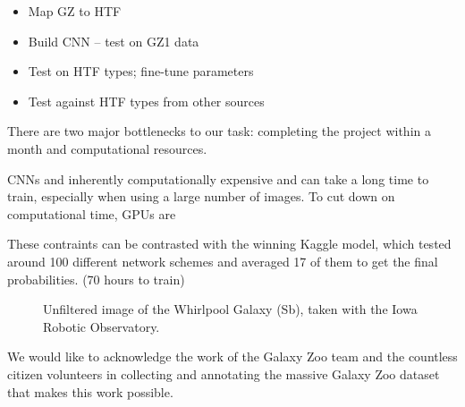 \documentclass[twocolumn]{aastex6}
\begin{document}
\begin{itemize}
\item	Map GZ to HTF
\item	Build CNN -- test on GZ1 data
\item	Test on HTF types; fine-tune parameters
\item	Test against HTF types from other sources
\end{itemize}

There are two major bottlenecks to our task: completing the project within a month and computational resources. 

CNNs and inherently computationally expensive and can take a long time to train, especially when using a large number of images. To cut down on computational time, GPUs are 

These contraints can be contrasted with the winning Kaggle model, which tested around 100 different network schemes and averaged 17 of them to get the final probabilities. (70 hours to train)

\begin{figure}[!t]
\caption{Unfiltered image of the Whirlpool Galaxy (Sb), taken with the Iowa Robotic Observatory.}
\end{figure}

We would like to acknowledge the work of the Galaxy Zoo team and the countless citizen volunteers in collecting and annotating the massive Galaxy Zoo dataset that makes this work possible. 


\end{document}
